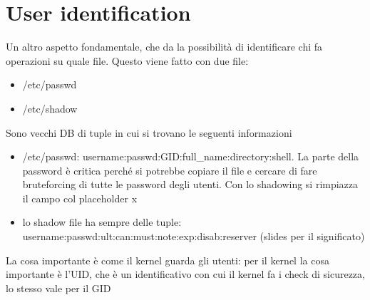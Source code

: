 \documentclass[12pt, oneside]{extbook} %
\begin{document}
\section{User identification}
Un altro aspetto fondamentale, che da la possibilità di identificare chi fa operazioni su quale file. Questo viene fatto con due file:
\begin{itemize}
\item \textsf{/etc/passwd}
\item \textsf{/etc/shadow}
\end{itemize}
Sono vecchi DB di tuple in cui si trovano le seguenti informazioni
\begin{itemize}
\item \textsf{/etc/passwd}: username:passwd:GID:full\_name:directory:shell. La parte della password è critica perché si potrebbe copiare il file e cercare di fare bruteforcing di tutte le password degli utenti. Con lo shadowing si rimpiazza il campo col placeholder x
\item lo shadow file ha sempre delle tuple: username:passwd:ult:can:must:note:exp:disab:reserver (slides per il significato)
\end{itemize}
La cosa importante è come il kernel guarda gli utenti: per il kernel la cosa importante è l'UID, che è un identificativo con cui il kernel fa i check di sicurezza, lo stesso vale per il GID
\end{document}
